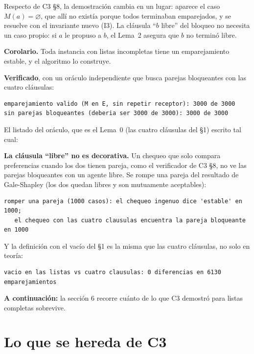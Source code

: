 \documentclass[11pt]{article}
\begin{document}
Respecto de C3 §8, la demostración cambia en un lugar: aparece el caso $M(a)=\varnothing$, que allí no existía
porque todos terminaban emparejados, y se resuelve con el invariante nuevo (I3). La cláusula ``$b$ libre'' del
bloqueo no necesita un caso propio: si $a$ le propuso a $b$, el Lema~2 asegura que $b$ no terminó libre.

\textbf{Corolario.} Toda instancia con listas incompletas tiene un emparejamiento estable, y el algoritmo lo
construye.

\textbf{Verificado}, con un oráculo independiente que busca parejas bloqueantes con las cuatro cláusulas:
\begin{lstlisting}[style=salida,basicstyle=\ttfamily\footnotesize\color{black},columns=fixed]
emparejamiento valido (M en E, sin repetir receptor): 3000 de 3000
sin parejas bloqueantes (deberia ser 3000 de 3000): 3000 de 3000
\end{lstlisting}
El listado del oráculo, que es el Lema~0 (las cuatro cláusulas del §1) escrito tal cual:



\textbf{La cláusula ``libre'' no es decorativa.} Un chequeo que solo compara preferencias cuando los dos
tienen pareja, como el verificador de C3 §8, no ve las parejas bloqueantes con un agente libre. Se rompe una pareja del
resultado de Gale-Shapley (los dos quedan libres y son mutuamente aceptables):
\begin{lstlisting}[style=salida,basicstyle=\ttfamily\footnotesize\color{black},columns=fixed]
romper una pareja (1000 casos): el chequeo ingenuo dice 'estable' en 1000;
   el chequeo con las cuatro clausulas encuentra la pareja bloqueante en 1000
\end{lstlisting}
Y la definición con el vacío del §1 es la misma que las cuatro cláusulas, no solo en teoría:
\begin{lstlisting}[style=salida,basicstyle=\ttfamily\footnotesize\color{black},columns=fixed]
vacio en las listas vs cuatro clausulas: 0 diferencias en 6130 emparejamientos
\end{lstlisting}
\textbf{A continuación:} la sección 6 recorre cuánto de lo que C3 demostró para listas completas sobrevive.

\section{Lo que se hereda de C3}
\end{document}
